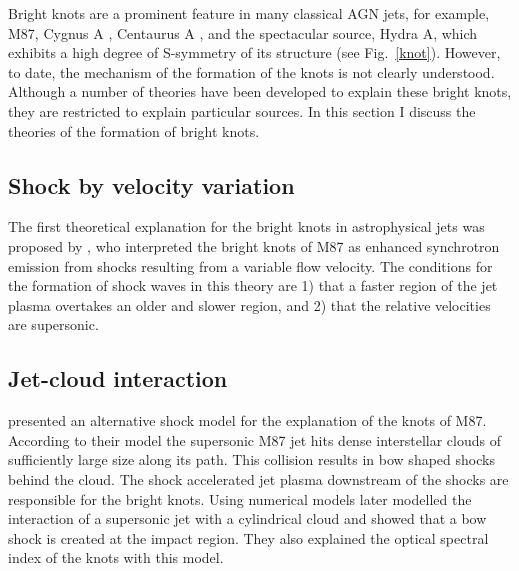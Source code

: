 Bright knots are a prominent feature in many classical AGN jets, for example, M87\citep{owen89}, Cygnus A \citep{steenbrugge07}, Centaurus A \citep{goodger10}, and the spectacular source, Hydra A,  which exhibits a high degree of S-symmetry of its structure \citep{taylor90} (see Fig.~\ref{knot}). However, to date, the mechanism of the formation of the knots is not clearly understood. Although a number of theories have been developed to explain these bright knots, they are restricted to explain particular sources. In this section I discuss the theories of the formation of bright knots.

\subsection{Shock by velocity variation}
The first theoretical explanation for the bright knots in astrophysical jets was proposed by \citet{rees78}, who interpreted the bright knots of M87 as enhanced synchrotron emission from shocks resulting from a variable flow velocity. The conditions for the formation of shock waves in this theory are 1) that a faster region of the jet plasma overtakes an older and slower region, and 2) that the relative velocities are supersonic.  




\subsection{Jet-cloud interaction}
\citet{blandford79} presented an alternative shock model for the explanation of the knots of M87. According to their model the supersonic M87 jet hits dense interstellar clouds of sufficiently large size along its path. This collision results in bow shaped shocks behind the cloud. The shock accelerated jet plasma downstream of the shocks are responsible for the bright knots. Using numerical models \citet{coleman85} later modelled the interaction of a supersonic jet with a cylindrical cloud and showed that a bow shock is created at the impact region. They also explained the optical spectral index of the knots with this model.  


